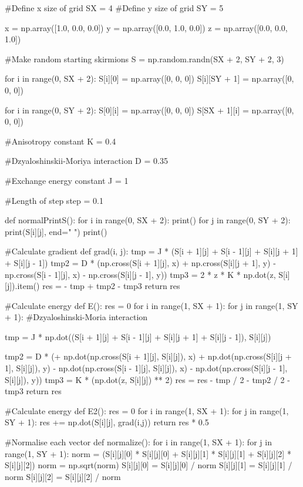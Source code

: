 \documentclass[ 12pt,x11names]{article}
\begin{document}
  \begin{python}
#Define  x size of grid
SX = 4
#Define y size of grid
SY = 5

x = np.array([1.0, 0.0, 0.0])
y = np.array([0.0, 1.0, 0.0])
z = np.array([0.0, 0.0, 1.0])

#Make random starting skirmions
S = np.random.randn(SX + 2, SY + 2, 3)

for i in range(0, SX + 2):
    S[i][0] = np.array([0, 0, 0])
    S[i][SY + 1] = np.array([0, 0, 0])

for i in range(0, SY + 2):
    S[0][i] = np.array([0, 0, 0])
    S[SX + 1][i] = np.array([0, 0, 0])

#Anisotropy constant
K = 0.4

#Dzyaloshinskii-Moriya interaction
D = 0.35

#Exchange energy constant
J = 1

#Length of step
step = 0.1

def normalPrintS():
    for i in range(0, SX + 2):
        print()
        for j in range(0, SY + 2):
            print(S[i][j], end=" ")
    print()

#Calculate gradient
def grad(i, j):
    tmp = J * (S[i + 1][j] + S[i - 1][j] +
               S[i][j + 1] + S[i][j - 1])
    tmp2 = D * (np.cross(S[i + 1][j], x) +
                np.cross(S[i][j + 1], y) -
                np.cross(S[i - 1][j], x) -
                np.cross(S[i][j - 1], y))
    tmp3 = 2 * z * K * np.dot(z, S[i][j]).item()
    res = - tmp + tmp2 - tmp3
    return res

#Calculate energy
def E():
    res = 0
    for i in range(1, SX + 1):
        for j in range(1, SY + 1):
            #Dzyaloshinski-Moria interaction

            tmp = J * np.dot((S[i + 1][j] +
            S[i - 1][j] + S[i][j + 1] + S[i][j - 1]), S[i][j])


            tmp2 = D * (+ np.dot(np.cross(S[i + 1][j], S[i][j]), x)
                        + np.dot(np.cross(S[i][j + 1], S[i][j]), y)
                        - np.dot(np.cross(S[i - 1][j], S[i][j]), x)
                        - np.dot(np.cross(S[i][j - 1], S[i][j]), y))
            tmp3 = K * (np.dot(z, S[i][j]) ** 2)
            res = res - tmp / 2 - tmp2 / 2 - tmp3
    return res

#Calculate energy
def E2():
    res = 0
    for i in range(1, SX + 1):
        for j in range(1, SY + 1):
            res += np.dot(S[i][j], grad(i,j))
    return res * 0.5

#Normalise each vector
def normalize():
    for i in range(1, SX + 1):
        for j in range(1, SY + 1):
            norm = (S[i][j][0] * S[i][j][0] +
                    S[i][j][1] * S[i][j][1] +
                    S[i][j][2] * S[i][j][2])
            norm = np.sqrt(norm)
            S[i][j][0] = S[i][j][0] / norm
            S[i][j][1] = S[i][j][1] / norm
            S[i][j][2] = S[i][j][2] / norm


\end{python}
\end{document}
